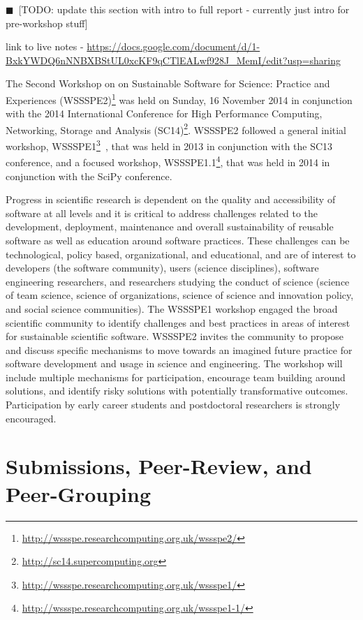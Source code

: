 \documentclass[11pt, oneside]{amsart}
\newcommand{\todo}[1]{{\color{blue}$\blacksquare$~\textsf{[TODO: #1]}}}
\begin{document}
\todo{update this section with intro to full report - currently just intro for pre-workshop stuff}

link to live notes -
\url{https://docs.google.com/document/d/1-BxkYWDQ6nNNBXBStUL0xcKF9qCTlEALwf928J_MemI/edit?usp=sharing}

The Second Workshop on on Sustainable Software for Science: Practice and
Experiences
(WSSSPE2)\footnote{\url{http://wssspe.researchcomputing.org.uk/wssspe2/}} was
held on Sunday, 16 November 2014 in conjunction with the 2014 International
Conference for High Performance Computing, Networking, Storage and Analysis
(SC14)\footnote{\url{http://sc14.supercomputing.org}}.
WSSSPE2 followed a general initial workshop,
WSSSPE1\footnote{\url{http://wssspe.researchcomputing.org.uk/wssspe1/}}~\cite{WSSSPE1-pre-report,WSSSPE1},
that was held in 2013 in conjunction with the SC13 conference, and a focused
workshop,
WSSSPE1.1\footnote{\url{http://wssspe.researchcomputing.org.uk/wssspe1-1/}},
that was held in 2014 in conjunction with the SciPy conference.

Progress in scientific research is dependent on the quality and accessibility of
software at all levels and it is critical to address challenges related to the
development, deployment, maintenance and overall sustainability of reusable
software as well as education around software practices. These challenges can be
technological, policy based, organizational, and educational, and are of
interest to developers (the software community), users (science disciplines),
software engineering researchers, and researchers studying the conduct of
science (science of team science, science of organizations, science of science
and innovation policy, and social science communities). The WSSSPE1 workshop
engaged the broad scientific community to identify challenges and best practices
in areas of interest for sustainable scientific software. WSSSPE2 invites the
community to propose and discuss specific mechanisms to move towards an imagined
future practice for software development and usage in science and engineering.
The workshop will include multiple mechanisms for participation, encourage team
building around solutions, and identify risky solutions with potentially
transformative outcomes. Participation by early career students and postdoctoral
researchers is strongly encouraged.



\section{Submissions, Peer-Review, and Peer-Grouping}
\end{document}
